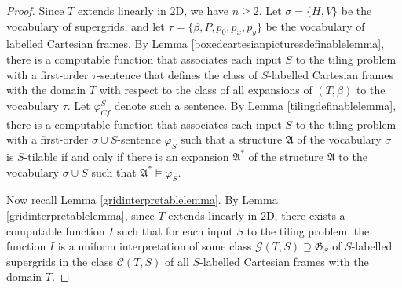 \documentclass{LMCS}
\theoremstyle{plain}
\newcommand{\mf}{\mathfrak}
\newcommand{\mi}{\mathit}
\begin{document}
\begin{proof}
%
Since $T$ extends linearly in $\mathrm{2D}$, we have $n\geq 2$.
%
Let $\sigma = \{H,V\}$ be the vocabulary of
%
supergrids, and let $\tau = \{\beta,P,p_0,p_x,p_y\}$ be the vocabulary of
%
labelled Cartesian frames.
%
By Lemma \ref{boxedcartesianpicturesdefinablelemma},
%
there is a computable function that associates each input $S$ to the tiling problem
%
with a first-order $\tau$-sentence that defines the class of $S$-labelled Cartesian frames with
%
the domain $T$ with respect to the class of all
%
expansions of $(T,\beta)$ to
%
the vocabulary $\tau$. Let $\varphi_{\mi{Cf}}^S$ denote
%
such a sentence.
%
%
%
%
%
%
%
%
By Lemma \ref{tilingdefinablelemma}, there is a
%
computable function that associates each input $S$ to the tiling problem with a
%
first-order $\sigma\cup S$-sentence $\varphi_{S}$
%
such that a structure $\mf{A}$ of the vocabulary $\sigma$ is $S$-tilable if and only if there is an
%
expansion $\mf{A}^*$ of the structure
%
$\mf{A}$ to the vocabulary $\sigma\cup S$ such that 
%
$\mf{A}^*\models\varphi_{S}$.
%



%
Now recall Lemma \ref{gridinterpretablelemma}.
%
By Lemma \ref{gridinterpretablelemma}, since $T$ extends linearly in $\mathrm{2D}$,
%
there exists a computable
%
function $I$ such that for each input $S$ to the tiling problem,
%
the function $I$ is a uniform interpretation
%
of some class $\mathcal{G}(T,S)\supseteq \mf{G}_S$  of
%
$S$-labelled supergrids in the class $\mathcal{C}(T,S)$ of
%
all $S$-labelled Cartesian frames with the domain $T$.
%




\end{proof}
\end{document}
